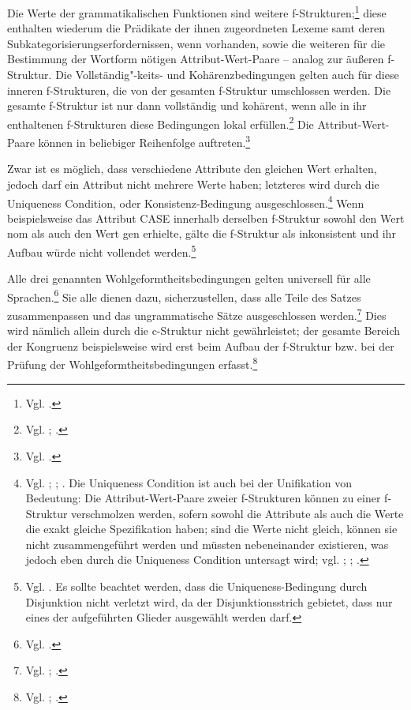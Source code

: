 \documentclass[12pt,a4paper]{article}
\begin{document}
Die Werte der grammatikalischen Funktionen sind weitere f-Strukturen;\footnote{Vgl. \cite[35]{Rohrer}.} diese enthalten wiederum die Prädikate der ihnen zugeordneten Lexeme samt deren Subkategorisierungserfordernissen, wenn vorhanden, sowie die weiteren für die Bestimmung der Wortform nötigen Attribut-Wert-Paare -- analog zur äußeren f-Struktur. Die Vollständig"-keits- und Kohärenzbedingungen gelten auch für diese inneren f-Strukturen, die von der gesamten f-Struktur umschlossen werden. Die gesamte f-Struktur ist nur dann vollständig und kohärent, wenn alle in ihr enthaltenen f-Strukturen diese Bedingungen lokal erfüllen.\footnote{Vgl. \cite[60]{Falk}; \cite[19-21]{Skript}.}
Die Attribut-Wert-Paare können in beliebiger Reihenfolge auftreten.\footnote{Vgl. \cite[35]{Rohrer}.}

Zwar ist es möglich, dass verschiedene Attribute den gleichen Wert erhalten, jedoch darf ein Attribut nicht mehrere Werte haben; letzteres wird durch die Uniqueness Condition, oder Konsistenz-Bedingung ausgeschlossen.\footnote{Vgl. \cite[62]{Falk}; \cite[29]{Rohrer}; \cite[18-9]{Skript}. Die Uniqueness Condition ist auch bei der Unifikation von Bedeutung: Die Attribut-Wert-Paare zweier f-Strukturen können zu einer f-Struktur verschmolzen werden, sofern sowohl die Attribute als auch die Werte die exakt gleiche Spezifikation haben; sind die Werte nicht gleich, können sie nicht zusammengeführt werden und müssten nebeneinander existieren, was jedoch eben durch die Uniqueness Condition untersagt wird; vgl. \cite[68]{Falk}; \cite[37]{Rohrer}; \cite[18-9]{Skript}.} Wenn beispielsweise das Attribut CASE innerhalb derselben f-Struktur sowohl den Wert nom als auch den Wert gen erhielte, gälte die f-Struktur als inkonsistent und ihr Aufbau würde nicht vollendet werden.\footnote{Vgl. \cite[29; 35]{Rohrer}. Es sollte beachtet werden, dass die Uniqueness-Bedingung durch Disjunktion nicht verletzt wird, da der Disjunktionsstrich gebietet, dass nur eines der aufgeführten Glieder ausgewählt werden darf.} 

Alle drei genannten Wohlgeformtheitsbedingungen gelten universell für alle Sprachen.\footnote{Vgl. \cite[21]{Skript}.} Sie alle dienen dazu, sicherzustellen, dass alle Teile des Satzes zusammenpassen und das ungrammatische Sätze ausgeschlossen werden.\footnote{Vgl. \cite[58; 62]{Falk}; \cite[29]{Rohrer}.} Dies wird nämlich allein durch die c-Struktur nicht gewährleistet; der gesamte Bereich der Kongruenz beispielsweise wird erst beim Aufbau der f-Struktur bzw. bei der Prüfung der Wohlgeformtheitsbedingungen erfasst.\footnote{Vgl. \cite[24]{Rohrer}; \cite[18]{Skript}.}
\end{document}
